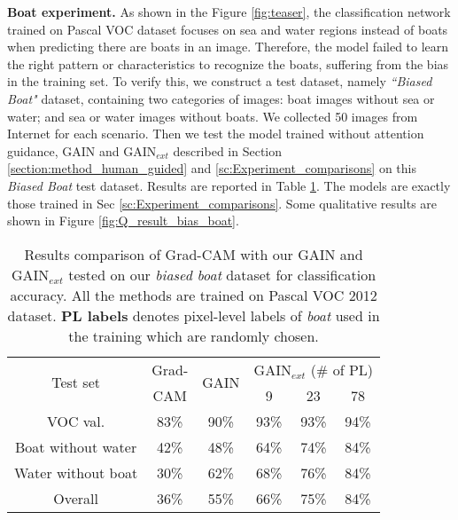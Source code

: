 \documentclass[10pt,twocolumn,letterpaper]{article}
\begin{document}
\textbf{Boat experiment.} As shown in the Figure \ref{fig:teaser}, the classification network trained on Pascal VOC dataset focuses on sea and water regions instead of boats when predicting there are boats in an image. Therefore, the model failed to learn the right pattern or characteristics to recognize the boats, suffering from the bias in the training set. To verify this, we construct a test dataset, namely \textit{``Biased Boat"} dataset, containing two categories of images: boat images without sea or water; and sea or water images without boats. We collected 50 images from Internet for each scenario. Then we test the model trained without attention guidance, GAIN and GAIN$_{ext}$ described in Section \ref{section:method_human_guided} and \ref{sc:Experiment_comparisons} on this \textit{Biased Boat} test dataset. Results are reported in Table \ref{tb:test_bias_results}. The models are exactly those trained in Sec \ref{sc:Experiment_comparisons}. Some qualitative results are shown in Figure \ref{fig:Q_result_bias_boat}.

\begin{table}
\begin{center}
\begin{tabular}{cccccc}
\hline
\multirow{2}{*}{Test set} & Grad- & \multirow{2}{*}{GAIN} &\multicolumn{3}{c}{GAIN$_{ext}$ (\# of PL)} \\\cline{4-6}
& CAM &  & 9 & 23 & 78 \\\cline{4-6}\hline\hline
VOC val. & 83\% & 90\% & 93\% & 93\% & 94\%\\ \hline
Boat without water & 42\% & 48\% & 64\% & 74\% & 84\%\\
Water without boat & 30\% & 62\% & 68\% & 76\% & 84\%\\
Overall & 36\% & 55\% & 66\% & 75\% & 84\%\\
\hline
\end{tabular}
\end{center}
\caption{Results comparison of Grad-CAM \cite{grad-cam} with our GAIN and GAIN$_{ext}$ tested on our \emph{biased boat} dataset for classification accuracy. All the methods are trained on Pascal VOC 2012 dataset. \textbf{PL labels} denotes pixel-level labels of \emph{boat} used in the training which are randomly chosen. } %
\label{tb:test_bias_results}
\end{table}
\end{document}
